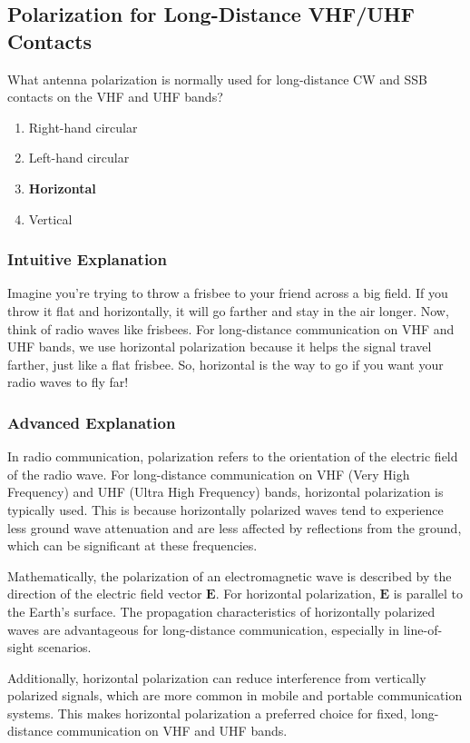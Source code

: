 \subsection{Polarization for Long-Distance VHF/UHF Contacts}
\label{T3A03}

\begin{tcolorbox}[colback=gray!10!white,colframe=black!75!black,title=T3A03]
What antenna polarization is normally used for long-distance CW and SSB contacts on the VHF and UHF bands?
\begin{enumerate}[label=\Alph*)]
    \item Right-hand circular
    \item Left-hand circular
    \item \textbf{Horizontal}
    \item Vertical
\end{enumerate}
\end{tcolorbox}

\subsubsection{Intuitive Explanation}
Imagine you're trying to throw a frisbee to your friend across a big field. If you throw it flat and horizontally, it will go farther and stay in the air longer. Now, think of radio waves like frisbees. For long-distance communication on VHF and UHF bands, we use horizontal polarization because it helps the signal travel farther, just like a flat frisbee. So, horizontal is the way to go if you want your radio waves to fly far!

\subsubsection{Advanced Explanation}
In radio communication, polarization refers to the orientation of the electric field of the radio wave. For long-distance communication on VHF (Very High Frequency) and UHF (Ultra High Frequency) bands, horizontal polarization is typically used. This is because horizontally polarized waves tend to experience less ground wave attenuation and are less affected by reflections from the ground, which can be significant at these frequencies.

Mathematically, the polarization of an electromagnetic wave is described by the direction of the electric field vector $\mathbf{E}$. For horizontal polarization, $\mathbf{E}$ is parallel to the Earth's surface. The propagation characteristics of horizontally polarized waves are advantageous for long-distance communication, especially in line-of-sight scenarios.

Additionally, horizontal polarization can reduce interference from vertically polarized signals, which are more common in mobile and portable communication systems. This makes horizontal polarization a preferred choice for fixed, long-distance communication on VHF and UHF bands.

